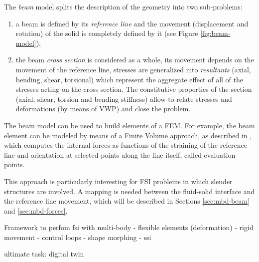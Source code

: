 The \textit{beam} model splits the description of the geometry into two sub-problems:
\begin{enumerate}
	\item a beam is defined by its \textit{reference line} and the movement (displacement and rotation) of the solid is completely defined by it (see Figure \ref{fig:beam-model}),
	\item the beam \textit{cross section} is considered as a whole, its movement depends on the movement of the reference line, stresses are generalized into \textit{resultants} (axial, bending, shear, torsional) which represent the aggregate effect of all of the stresses acting on the cross section. The constitutive properties of the section (axial, shear, torsion and bending stiffness) allow to relate stresses and deformations (by means of VWP) and close the problem.
\end{enumerate}


The beam model can be used to build elements of a FEM. For example, the beam element can be modeled by means of a Finite Volume approach, as described in \cite{ghiringhelli2000multibody}, which computes the internal forces as functions of the straining of the reference line and orientation at selected points along the line itself, called evaluation points.

This approach is particularly interesting for FSI problems in which slender structures are involved. A mapping is needed between the fluid-solid interface and the reference line movement, which will be described in Sections \ref{sec:mbd-beam} and \ref{sec:mbd-forces}.




\cite{caccia2021coupling}




Framework to perfom fsi with multi-body
- flexible elements (deformation)
- rigid movement
- control loops
- shape morphing
- ssi


ultimate task: digital twin